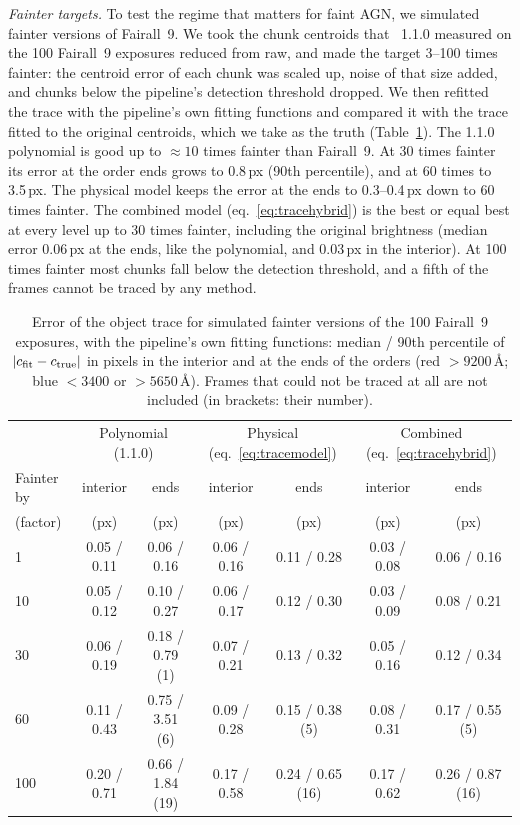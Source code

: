 \textit{Fainter targets.} To test the regime that matters for faint AGN, we simulated fainter versions of Fairall~9.
We took the chunk centroids that \banzai{}~1.1.0 measured on the 100 Fairall~9 exposures reduced from raw, and made
the target 3--100 times fainter: the centroid error of each chunk was scaled up, noise of that size added, and chunks
below the pipeline's detection threshold dropped. We then refitted the trace with the pipeline's own fitting
functions and compared it with the trace fitted to the original centroids, which we take as the truth
(Table~\ref{tab:tracefaint}). The 1.1.0 polynomial is good up to $\approx10$ times fainter than Fairall~9. At 30 times
fainter its error at the order ends grows to 0.8\,px (90th percentile), and at 60 times to 3.5\,px. The physical
model keeps the error at the ends to 0.3--0.4\,px down to 60 times fainter. The combined model
(eq.~\ref{eq:tracehybrid}) is the best or equal best at every level up to 30 times fainter, including the original
brightness (median error 0.06\,px at the ends, like the polynomial, and 0.03\,px in the interior). At 100 times
fainter most chunks fall below the detection threshold, and a fifth of the frames cannot be traced by any method.

\begin{table}[!htbp]
\centering
\caption{Error of the object trace for simulated fainter versions of the 100 Fairall~9 exposures, with the
pipeline's own fitting functions: median / 90th percentile of $|c_{\rm fit}-c_{\rm true}|$ in pixels in the
interior and at the ends of the orders (red $>9200$\,\AA; blue $<3400$ or $>5650$\,\AA). Frames that could not be
traced at all are not included (in brackets: their number).}
\label{tab:tracefaint}
\begin{tabular}{lcccccc}
\toprule
 & \multicolumn{2}{c}{Polynomial (1.1.0)} & \multicolumn{2}{c}{Physical (eq.~\ref{eq:tracemodel})} &
 \multicolumn{2}{c}{Combined (eq.~\ref{eq:tracehybrid})} \\
Fainter by & interior & ends & interior & ends & interior & ends \\
(factor) & (px) & (px) & (px) & (px) & (px) & (px) \\
\midrule
1 & 0.05 / 0.11 & 0.06 / 0.16 & 0.06 / 0.16 & 0.11 / 0.28 & 0.03 / 0.08 & 0.06 / 0.16 \\
10 & 0.05 / 0.12 & 0.10 / 0.27 & 0.06 / 0.17 & 0.12 / 0.30 & 0.03 / 0.09 & 0.08 / 0.21 \\
30 & 0.06 / 0.19 & 0.18 / 0.79 (1) & 0.07 / 0.21 & 0.13 / 0.32 & 0.05 / 0.16 & 0.12 / 0.34 \\
60 & 0.11 / 0.43 & 0.75 / 3.51 (6) & 0.09 / 0.28 & 0.15 / 0.38 (5) & 0.08 / 0.31 & 0.17 / 0.55 (5) \\
100 & 0.20 / 0.71 & 0.66 / 1.84 (19) & 0.17 / 0.58 & 0.24 / 0.65 (16) & 0.17 / 0.62 & 0.26 / 0.87 (16) \\
\bottomrule
\end{tabular}
\end{table}

